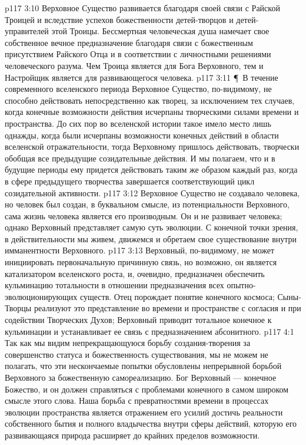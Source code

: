 \vs p117 3:10 Верховное Существо развивается благодаря своей связи с Райской Троицей и вследствие успехов божественности детей\hyp{}творцов и детей\hyp{}управителей этой Троицы. Бессмертная человеческая душа намечает свое собственное вечное предназначение благодаря связи с божественным присутствием Райского Отца и в соответствии с личностными решениями человеческого разума. Чем Троица является для Бога Верховного, тем и Настройщик является для развивающегося человека.
\vs p117 3:11 \P\ В течение современного вселенского периода Верховное Существо, по\hyp{}видимому, не способно действовать непосредственно как творец, за исключением тех случаев, когда конечные возможности действия исчерпаны творческими силами времени и пространства. До сих пор во вселенской истории такое имело место лишь однажды, когда были исчерпаны возможности конечных действий в области вселенской отражательности, тогда Верховному пришлось действовать, творчески обобщая все предыдущие созидательные действия. И мы полагаем, что и в будущие периоды ему придется действовать таким же образом каждый раз, когда в сфере предыдущего творчества завершается соответствующий цикл созидательной активности.
\vs p117 3:12 Верховное Существо не создавало человека, но человек был создан, в буквальном смысле, из потенциальности Верховного, сама жизнь человека является его производным. Он и не развивает человека; однако Верховный представляет самую суть эволюции. С конечной точки зрения, в действительности мы живем, движемся и обретаем свое существование внутри имманентности Верховного.
\vs p117 3:13 Верховный, по\hyp{}видимому, не может инициировать первоначальную причинную связь, но возможно, он является катализатором вселенского роста, и, очевидно, предназначен обеспечить кульминацию тотальности в отношении предназначения всех опытно\hyp{}эволюционирующих существ. Отец порождает понятие конечного космоса; Сыны\hyp{}Творцы реализуют это представление во времени и пространстве с согласия и при содействии Творческих Духов; Верховный приводит тотальное конечное к кульминации и устанавливает ее связь с предназначением абсонитного.
\vs p117 4:1 Так как мы видим непрекращающуюся борьбу создания\hyp{}творения за совершенство статуса и божественность существования, мы не можем не полагать, что эти нескончаемые попытки обусловлены непрерывной борьбой Верховного за божественную самореализацию. Бог Верховный --- конечное Божество, и он должен справляться с проблемами конечного в самом широком смысле этого слова. Наша борьба с превратностями времени в процессах эволюции пространства является отражением его усилий достичь реальности собственного бытия и полного владычества внутри сферы действий, которую его развивающаяся природа расширяет до крайних пределов возможности.
